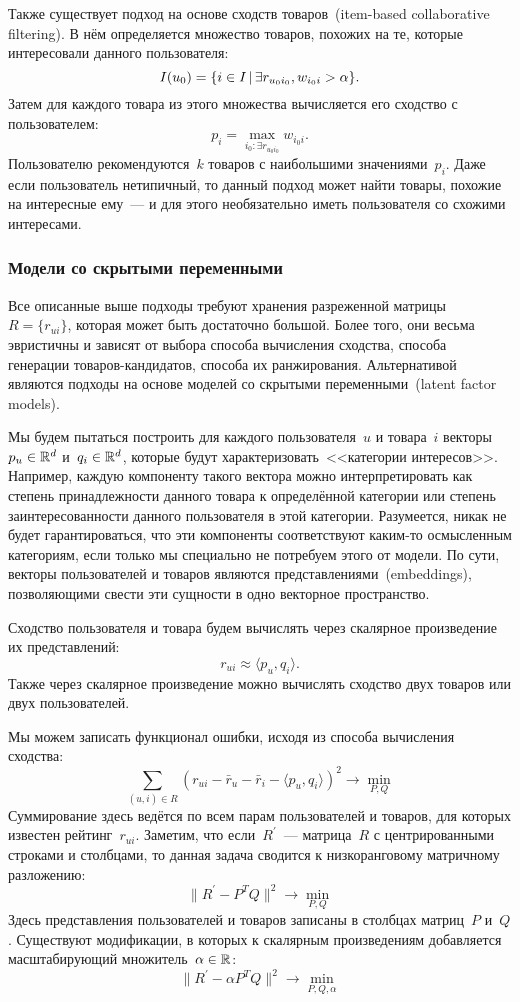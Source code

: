 \documentclass[12pt,fleqn]{article}
\begin{document}
Также существует подход на основе сходств товаров~(item-based collaborative filtering).
В нём определяется множество товаров, похожих на те, которые интересовали данного пользователя:
\[
    I(u_0)
    =
    \{
        i \in I
        \mspace{3mu}{|}\mspace{3mu}
        \exists r_{u_0 i_0},
        w_{i_0 i} > \alpha
    \}.
\]
Затем для каждого товара из этого множества вычисляется его сходство с пользователем:
\[
    p_i
    =
    \max_{i_0: \exists r_{u_0 i_0}}
    w_{i_0 i}.
\]
Пользователю рекомендуются~$k$ товаров с наибольшими значениями~$p_i$.
Даже если пользователь нетипичный, то данный подход может найти товары, похожие
на интересные ему~--- и для этого необязательно иметь пользователя со схожими интересами.

\subsubsection{Модели со скрытыми переменными}
Все описанные выше подходы требуют хранения разреженной матрицы~$R = \{r_{ui}\}$,
которая может быть достаточно большой.
Более того, они весьма эвристичны и зависят от выбора способа вычисления сходства,
способа генерации товаров-кандидатов, способа их ранжирования.
Альтернативой являются подходы на основе моделей со скрытыми переменными~(latent factor models).

Мы будем пытаться построить для каждого пользователя~$u$ и товара~$i$ векторы~$p_u \in \mathbb{R}^d$
и~$q_i \in \mathbb{R}^d$, которые будут характеризовать~<<категории интересов>>.
Например, каждую компоненту такого вектора можно интерпретировать как степень принадлежности
данного товара к определённой категории или степень заинтересованности данного пользователя
в этой категории.
Разумеется, никак не будет гарантироваться, что эти компоненты соответствуют каким-то осмысленным категориям,
если только мы специально не потребуем этого от модели.
По сути, векторы пользователей и товаров являются представлениями~(embeddings),
позволяющими свести эти сущности в одно векторное пространство.

Сходство пользователя и товара будем вычислять через скалярное произведение их представлений:
\[
    r_{ui}
    \approx
    \langle p_u, q_i \rangle.
\]
Также через скалярное произведение можно вычислять сходство двух товаров или двух пользователей.

Мы можем записать функционал ошибки, исходя из способа вычисления сходства:
\begin{equation}
\label{eq:lfm}
    \sum_{(u, i) \in R}
        \left(
            r_{ui}
            - \bar r_u
            - \bar r_i
            - \langle p_u, q_i \rangle
        \right)^2
    \to
    \min_{P, Q}
\end{equation}
Суммирование здесь ведётся по всем парам пользователей и товаров, для которых известен рейтинг~$r_{ui}$.
Заметим, что если~$R^\prime$~--- матрица~$R$ с центрированными строками и столбцами,
то данная задача сводится к низкоранговому матричному разложению:
\[
    \|R^\prime - P^T Q\|^2 \to \min_{P, Q}
\]
Здесь представления пользователей и товаров записаны в столбцах матриц~$P$ и~$Q$.
Существуют модификации, в которых к скалярным произведениям добавляется масштабирующий множитель~$\alpha \in \mathbb{R}$:
\[
    \|R^\prime - \alpha P^T Q\|^2 \to \min_{P, Q, \alpha}
\]
\end{document}
